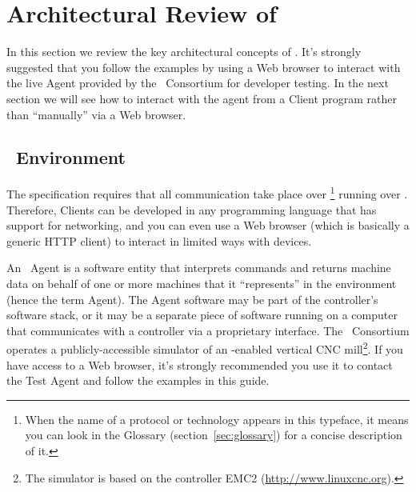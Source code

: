 
\section{Architectural Review of \mtc}
\label{sec:arch}

In this section we review the key architectural concepts of \mtc.  It's
strongly suggested that you follow the examples by using a Web browser 
to interact with the live
Agent provided by the \mtc~Consortium for developer testing.  In the
next section we will see how to interact with the agent from a Client
program rather than ``manually'' via a Web browser.

\subsection{\mtc~Environment}

The \mtc specification requires that all \mtc communication take place
over \footnote{When the name of a protocol or technology
  appears in this typeface, it means you can look in the Glossary
  (section~\ref{sec:glossary}) for a concise
  description of it.}
running over .  Therefore,
Clients can be developed in any programming language that has
support for networking, and you can even use a Web browser (which is
basically a generic HTTP client) to interact in limited ways with \mtc{}
devices. 

An \mtc~Agent is a software entity that interprets \mtc{} commands and
returns machine data on behalf of one or more machines that it
``represents'' in the \mtc{} environment (hence
the term Agent).  The Agent software may be part of the
controller's software stack, or it may be a separate piece of software
running on a computer that communicates with a controller via a
proprietary interface.
The \mtc~Consortium operates
a publicly-accessible simulator of an \mtc-enabled vertical CNC
mill\footnote{The simulator is based on the  controller EMC2 (\url{http://www.linuxcnc.org}).}. 
If you have access to a Web browser, it's strongly recommended you use
it to contact the Test Agent and follow the examples in this guide.


